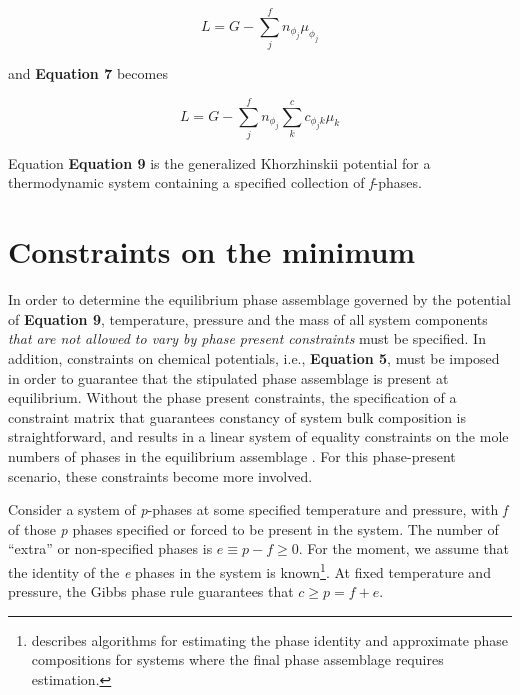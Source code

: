 \documentclass[11pt, titlepage, twoside]{article}
\begin{document}
\begin{MPEquation}[!ht]
\begin{equation}
L = G - \sum\limits_j^f {{n_{{\phi _j}}}{\mu _{{\phi _j}}}}
\end{equation}
\label{MPEquationElement:DFC5BE25-953A-4A29-8765-3A8FA4F642AC}
\end{MPEquation}
and \textbf{Equation 7} becomes


\begin{MPEquation}[!ht]
\begin{equation}
L = G - \sum\limits_j^f {{n_{{\phi _j}}}\sum\limits_k^c {{c_{{\phi _j}k}}{\mu _k}} }
\end{equation}
\label{MPEquationElement:F2DFC594-CBD9-4D42-9840-0BD135FF3C53}
\end{MPEquation}
Equation \textbf{Equation 9} is the generalized Khorzhinskii potential for a thermodynamic system containing a specified collection of \emph{f}-phases.


\section{Constraints on the minimum}\label{MPSection:736862DD-BD17-4212-AA84-E13BBFAA3A77}

In order to determine the equilibrium phase assemblage governed by the potential of \textbf{Equation 9}, temperature, pressure and the mass of all system components \emph{that are not allowed to vary by phase present constraints }must be specified. In addition, constraints on chemical potentials, i.e., \textbf{Equation 5}, must be imposed in order to guarantee that the stipulated phase assemblage is present at equilibrium. Without the phase present constraints, the specification of a constraint matrix that guarantees constancy of system bulk composition is straightforward, and results in a linear system of equality constraints on the mole numbers of phases in the equilibrium assemblage \cite{Ghio85}. For this phase-present scenario, these constraints become more involved.

Consider a system of \emph{p}-phases at some specified temperature and pressure, with \emph{f} of those \emph{p} phases specified or forced to be present in the system. The number of ``extra'' or non-specified phases is $e \equiv p - f \ge 0$. For the moment, we assume that the identity of the \emph{e} phases in the system is known\footnote{\cite{Ghiorso 2013)} describes algorithms for estimating the phase identity and approximate phase compositions for systems where the final phase assemblage requires estimation.

}. At fixed temperature and pressure, the Gibbs phase rule guarantees that $c \ge p = f + e$.
\end{document}

